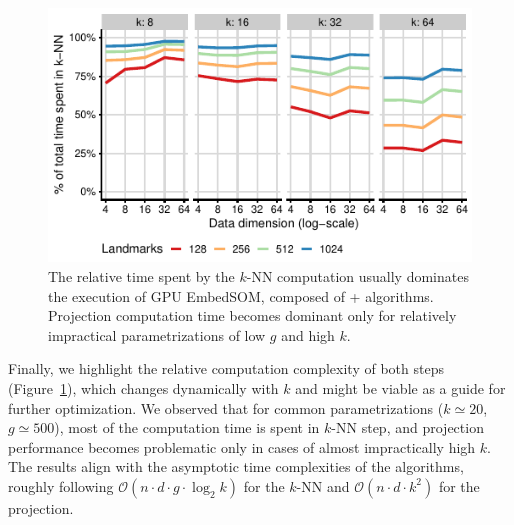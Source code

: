 \begin{figure}
	\centering
	\includegraphics{embedsom/final-plots/esom_percent_ampere}
	\caption{The relative time spent by the $k$-NN computation usually dominates the execution of GPU EmbedSOM, composed of + algorithms.
  Projection computation time becomes dominant only for relatively impractical parametrizations of low $g$ and high $k$.}
	\label{fig:proj_percent}
\end{figure}

Finally, we highlight the relative computation complexity of both steps (Figure~\ref{fig:proj_percent}), which changes dynamically with $k$ and might be viable as a guide for further optimization.
We observed that for common parametrizations ($k\simeq 20$, $g\simeq 500$), most of the computation time is spent in $k$-NN step, and projection performance becomes problematic only in cases of almost impractically high $k$.
The results align with the asymptotic time complexities of the algorithms, roughly following $\mathcal{O}(n\cdot d\cdot g\cdot \log_2 k)$ for the $k$-NN and $\mathcal{O}(n\cdot d \cdot k^2)$ for the projection.

